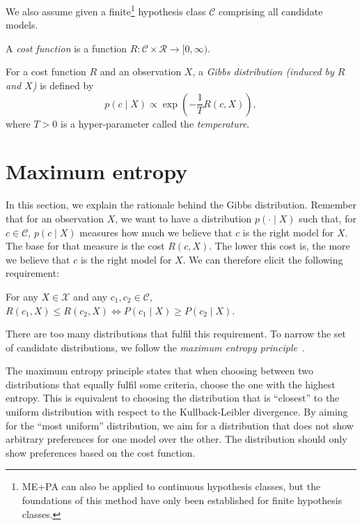 We also assume given a finite\footnote{ME+PA can also be applied to continuous hypothesis classes, but the foundations of this method have only been established for finite hypothesis classes.} hypothesis class $\mathcal{C}$ comprising all candidate models.

\begin{definition}
A \emph{cost function} is a function $R : \mathcal{C} \times \mathcal{R} \to [0, \infty)$.
\label{def:cost_fun}
\end{definition}

\begin{definition}
For a cost function $R$ and an observation $X$, a \emph{Gibbs distribution (induced by $R$ and $X$)} is defined by
%
\begin{equation}
p(c \mid X) \propto \exp\left(- \frac{1}{T} R(c, X)\right),
\end{equation}
%
where $T > 0$ is a hyper-parameter called the \emph{temperature}.
\label{def:gibbs_dist}
\end{definition}

\section{Maximum entropy}
\label{sec:max_entropy}

In this section, we explain the rationale behind the Gibbs distribution. Remember that for an observation $X$, we want to have a distribution $p(\cdot \mid X)$ such that, for $c \in \mathcal{C}$, $p(c \mid X)$ measures how much we believe that $c$ is the right model for $X$. The base for that measure is the cost $R(c, X)$. The lower this cost is, the more we believe that $c$ is the right model for $X$. We can therefore elicit the following requirement:

\begin{requirement}

For any $X \in \mathcal{X}$ and any $c_1, c_2 \in \mathcal{C}$, $R(c_1, X) \leq R(c_2, X)\Leftrightarrow P(c_1 \mid X) \geq P(c_2 \mid X)$.

\end{requirement}

There are too many distributions that fulfil this requirement. To narrow the set of candidate distributions, we follow the \emph{maximum entropy principle}~\cite{jaynes1957information, jaynes1957information2}. 

The maximum entropy principle states that when choosing between two distributions that equally fulfil some criteria, choose the one with the highest entropy. This is equivalent to choosing the distribution that is ``closest'' to the uniform distribution with respect to the Kullback-Leibler divergence. By aiming for the ``most uniform'' distribution, we aim for a distribution that does not show arbitrary preferences for one model over the other. The distribution should only show preferences based on the cost function.

